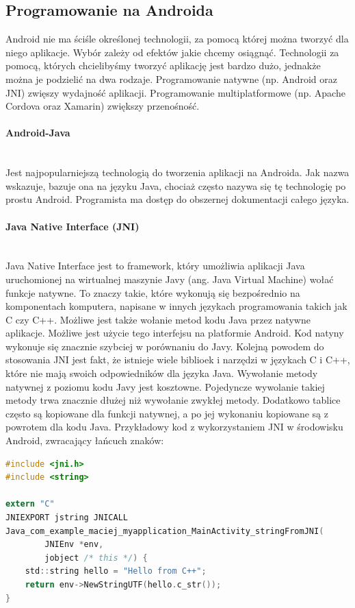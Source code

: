 \documentclass{article}
\numberwithin{equation}{section}
\begin{document}
\subsection{Programowanie na Androida}
Android nie ma ściśle określonej technologii, za pomocą której można tworzyć dla niego aplikacje. Wybór zależy od efektów jakie chcemy osiągnąć. Technologii za pomocą, których chcielibyśmy tworzyć aplikację jest bardzo dużo, jednakże można je podzielić na dwa rodzaje. Programowanie natywne (np. Android oraz JNI) zwięszy wydajność aplikacji. Programowanie multiplatformowe (np. Apache Cordova oraz Xamarin) zwiększy przenośność. 
\paragraph{Android-Java}\mbox{}\\
Jest najpopularniejszą technologią do tworzenia aplikacji na Androida. Jak nazwa wskazuje, bazuje ona na języku Java, chociaż często nazywa się tę technologię po prostu Android. Programista ma dostęp do obszernej dokumentacji całego języka.
\paragraph{Java Native Interface (JNI)}\mbox{}\\
Java Native Interface jest to framework, który umożliwia aplikacji Java uruchomionej na wirtualnej maszynie Javy (ang. Java Virtual Machine) wołać funkcje natywne. To znaczy takie, które wykonują się bezpośrednio na komponentach komputera, napisane w innych językach programowania takich jak C czy C++. Możliwe jest także wołanie metod kodu Java przez natywne aplikacje. Możliwe jest użycie tego interfejsu na platformie Android. Kod natyny wykonuje się znacznie szybciej w porównaniu do Javy. Kolejną powodem do stosowania JNI jest fakt, że istnieje wiele biblioek i narzędzi w językach C i C++, które nie mają swoich odpowiedników dla języka Java. Wywołanie metody natywnej z poziomu kodu Javy jest kosztowne. Pojedyncze wywolanie takiej metody trwa znacznie dłużej niż wywołanie zwykłej metody. Dodatkowo tablice często są kopiowane dla funkcji natywnej, a po jej wykonaniu kopiowane są z powrotem dla kodu Java. Przykładowy kod z wykorzystaniem JNI w środowisku Android, zwracający łańcuch znaków: 
\begin{lstlisting}[language=C]
#include <jni.h>
#include <string>

extern "C"
JNIEXPORT jstring JNICALL
Java_com_example_maciej_myapplication_MainActivity_stringFromJNI(
        JNIEnv *env,
        jobject /* this */) {
    std::string hello = "Hello from C++";
    return env->NewStringUTF(hello.c_str());
}
\end{lstlisting}
\end{document}
